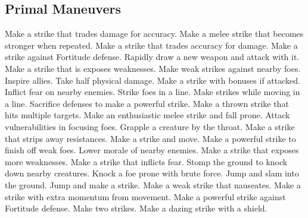 \subsection{Primal Maneuvers}\label{Primal Maneuvers}
\begin{spelllist}
 Make a strike that trades damage for accuracy.
 Make a melee strike that becomes stronger when repeated.
 Make a strike that trades accuracy for damage.
 Make a strike against Fortitude defense.
 Rapidly draw a new weapon and attack with it.
 Make a strike that is exposes weaknesses.
 Make weak strikes against nearby foes.
 Inspire allies.
 Take half physical damage.
 Make a strike with bonuses if attacked.
 Inflict fear on nearby enemies.
 Strike foes in a line.
 Make strikes while moving in a line.
 Sacrifice defenses to make a powerful strike.
 Make a thrown strike that hits multiple targets.
 Make an enthusiastic melee strike and fall prone.
 Attack vulnerabilities in focusing foes.
 Grapple a creature by the throat.
 Make a strike that strips away resistances.
 Make a strike and move.
 Make a powerful strike to finish off weak foes.
 Lower morale of nearby enemies.
 Make a strike that exposes more weaknesses.
 Make a strike that inflicts fear.
 Stomp the ground to knock down nearby creatures.
 Knock a foe prone with brute force.
 Jump and slam into the ground.
 Jump and make a strike.
 Make a weak strike that nauseates.
 Make a strike with extra momentum from movement.
 Make a powerful strike against Fortitude defense.
 Make two strikes.
 Make a dazing strike with a shield.

\end{spelllist}
